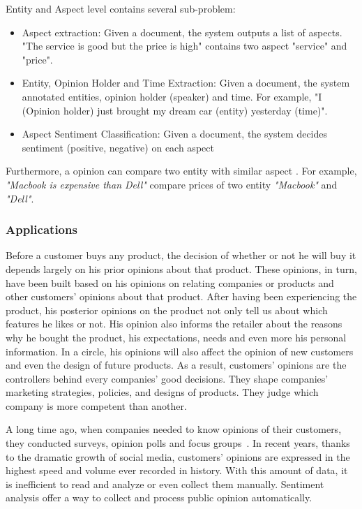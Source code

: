 Entity and Aspect level contains several sub-problem:
\begin{itemize}
    \item Aspect extraction: Given a document, the system outputs a list of aspects. "The service is good but the price is high" contains two aspect "service" and "price".
    \item Entity, Opinion Holder and Time Extraction: Given a document, the system annotated entities, opinion holder (speaker) and time. For example, "I (Opinion holder) just brought my dream car (entity) yesterday (time)".
    \item Aspect Sentiment Classification: Given a document, the system decides sentiment (positive, negative) on each aspect
\end{itemize}

 Furthermore, a opinion can compare two entity with similar aspect \cite{jindal2006mining}. For example, \textit{"Macbook is expensive than Dell"} compare prices of two entity \textit{"Macbook"} and \textit{"Dell"}.

\subsubsection{Applications}
Before a customer buys any product, the decision of whether or not he will buy it depends largely on his prior opinions about that product.
These opinions, in turn, have been built based on his opinions on relating companies or products and other customers' opinions about that product.
After having been experiencing the product, his posterior opinions on the product not only tell us about which features he likes or not.
His opinion also informs the retailer about the reasons why he bought the product, his expectations, needs and even more his personal information.
In a circle, his opinions will also affect the opinion of new customers and even the design of future products.
As a result, customers' opinions are the controllers behind every companies' good decisions.
They shape companies' marketing strategies, policies, and designs of products.
They judge which company is more competent than another.

A long time ago, when companies needed to know opinions of their customers, they conducted surveys, opinion polls and focus groups~\cite{liu2012sentiment}.
In recent years, thanks to the dramatic growth of social media, customers' opinions are expressed in the highest speed and volume ever recorded in history.
With this amount of data, it is inefficient to read and analyze or even collect them manually. Sentiment analysis offer a way to collect and process public opinion automatically.

